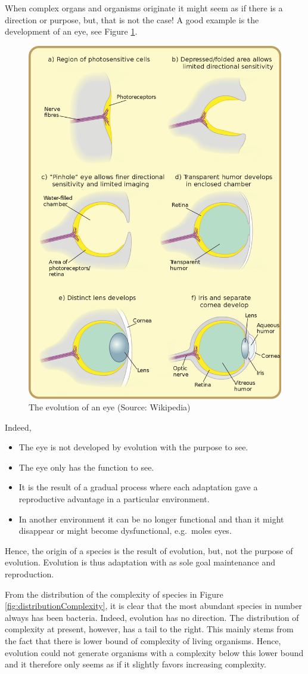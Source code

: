 \documentclass[
  11pt,
]{book}
\begin{document}
When complex organs and organisms originate it might seem as if there is a direction or purpose, but, that is not the case! A good example is the development of an eye, see Figure \ref{fig:evolutionEye}.

\begin{figure}

{\centering \includegraphics[width=0.45\linewidth]{./figs/evolutionEye} 

}

\caption{The evolution of an eye (Source: Wikipedia)}\label{fig:evolutionEye}
\end{figure}

Indeed,

\begin{itemize}
\item
  The eye is not developed by evolution with the purpose to see.
\item
  The eye only has the function to see.
\item
  It is the result of a gradual process where each adaptation gave a reproductive advantage in a particular environment.
\item
  In another environment it can be no longer functional and than it might disappear or might become dysfunctional, e.g.~moles eyes.
\end{itemize}

Hence, the origin of a species is the result of evolution, but, not the purpose of evolution. Evolution is thus adaptation with as sole goal maintenance and reproduction.

From the distribution of the complexity of species in Figure \ref{fig:distributionComplexity}, it is clear that the most abundant species in number always has been bacteria.
Indeed, evolution has no direction.
The distribution of complexity at present, however, has a tail to the right.
This mainly stems from the fact that there is lower bound of complexity of living organisms. Hence, evolution could not generate organisms with a complexity below this lower bound and it therefore only seems as if it slightly favors increasing complexity.
\end{document}
